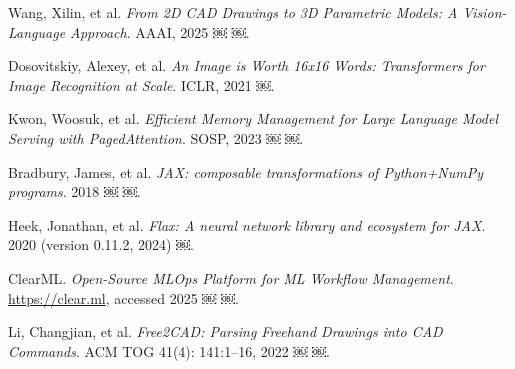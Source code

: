 \documentclass{article}
\begin{document}
\begin{thebibliography}{99}

 Wang, Xilin, et al. \textit{From 2D CAD Drawings to 3D Parametric Models: A Vision-Language Approach}. AAAI, 2025 ￼ ￼.

 Dosovitskiy, Alexey, et al. \textit{An Image is Worth 16x16 Words: Transformers for Image Recognition at Scale}. ICLR, 2021 ￼.

 Kwon, Woosuk, et al. \textit{Efficient Memory Management for Large Language Model Serving with PagedAttention}. SOSP, 2023 ￼ ￼.

 Bradbury, James, et al. \textit{JAX: composable transformations of Python+NumPy programs}. 2018 ￼ ￼.

 Heek, Jonathan, et al. \textit{Flax: A neural network library and ecosystem for JAX}. 2020 (version 0.11.2, 2024) ￼.

 ClearML. \textit{Open-Source MLOps Platform for ML Workflow Management}. \url{https://clear.ml}, accessed 2025 ￼ ￼.

 Li, Changjian, et al. \textit{Free2CAD: Parsing Freehand Drawings into CAD Commands}. ACM TOG 41(4): 141:1–16, 2022 ￼ ￼.

\end{thebibliography}
\end{document}
